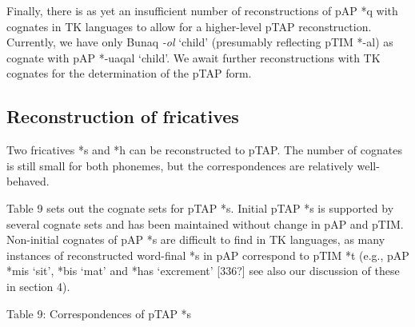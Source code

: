 \documentclass[a4paper]{article}
\begin{document}
Finally, there is as yet an insufficient number of reconstructions of pAP *q with cognates in TK languages to allow for a higher-level pTAP reconstruction. Currently, we have only Bunaq \textit{{}-ol} {\textquoteleft}child{\textquoteright} (presumably reflecting pTIM *-al) as cognate with pAP *-uaqal {\textquoteleft}child{\textquoteright}. We await further reconstructions with TK cognates for the determination of the pTAP form.

\subsection[Reconstruction of fricatives]{\textbf{Reconstruction of fricatives}}
Two fricatives *s and *h can be reconstructed to pTAP. The number of cognates is still small for both phonemes, but the correspondences are relatively well-behaved. 

Table 9 sets out the cognate sets for pTAP *s. Initial pTAP *s is supported by several cognate sets and has been maintained without change in pAP and pTIM. Non-initial cognates of pAP *s are difficult to find in TK languages, as many instances of reconstructed word-final *s in pAP correspond to pTIM *t (e.g., pAP *mis {\textquoteleft}sit{\textquoteright}, *bis {\textquoteleft}mat{\textquoteright} and *has {\textquoteleft}excrement{\textquoteright}  [336?]  see also our discussion of these in section 4).

{\centering
Table 9: Correspondences of pTAP *s
\par}
\end{document}

